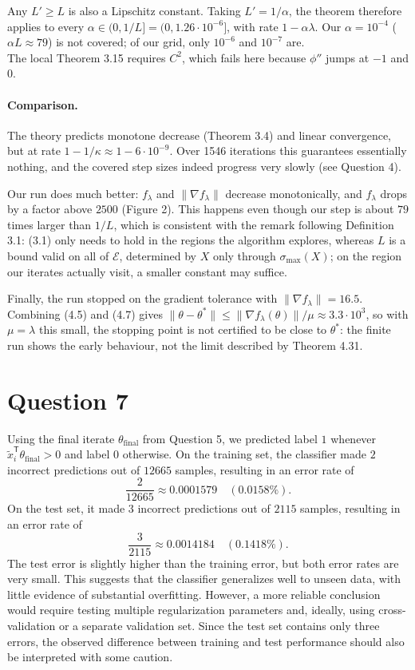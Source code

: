 \documentclass{article}
\theoremstyle{definition}
\theoremstyle{remark}
\begin{document}
Any $L' \ge L$ is also a Lipschitz constant. Taking $L' = 1/\alpha$, the theorem therefore applies to every $\alpha \in (0, 1/L] = (0, 1.26\cdot 10^{-6}]$, with rate $1 - \alpha\lambda$. Our $\alpha = 10^{-4}$ ($\alpha L \approx 79$) is not covered; of our grid, only $10^{-6}$ and $10^{-7}$ are. \\ The local Theorem 3.15 requires $C^2$, which fails here because $\phi''$ jumps at $-1$ and $0$.

\paragraph{Comparison.} The theory predicts monotone decrease (Theorem 3.4) and linear convergence, but at rate $1 - 1/\kappa \approx 1 - 6\cdot 10^{-9}$. Over 1546 iterations this guarantees essentially nothing, and the covered step sizes indeed progress very slowly (see Question 4).

Our run does much better: $f_\lambda$ and $\|\nabla f_\lambda\|$ decrease monotonically, and $f_\lambda$ drops by a factor above $2500$ (Figure 2). This happens even though our step is about $79$ times larger than $1/L$, which is consistent with the remark following Definition 3.1: (3.1) only needs to hold in the regions the algorithm explores, whereas $L$ is a bound valid on all of $\mathcal E$, determined by $X$ only through $\sigma_{\max}(X)$; on the region our iterates actually visit, a smaller constant may suffice.

Finally, the run stopped on the gradient tolerance with $\|\nabla f_\lambda\| = 16.5$. Combining (4.5) and (4.7) gives $\|\theta - \theta^*\| \le \|\nabla f_\lambda(\theta)\|/\mu \approx 3.3\cdot 10^{3}$, so with $\mu = \lambda$ this small, the stopping point is not certified to be close to $\theta^*$: the finite run shows the early behaviour, not the limit described by Theorem 4.31.


\section*{Question 7}
Using the final iterate $\theta_{\mathrm{final}}$ from Question 5, we predicted label $1$ whenever $\widetilde{x}_i^{\mathsf{T}}\theta_{\mathrm{final}}>0$ and label $0$ otherwise. On the training set, the classifier made $2$ incorrect predictions out of $12665$ samples, resulting in an error rate of
\[
\frac{2}{12665} \approx 0.0001579 \quad (0.0158\%).
\]
On the test set, it made $3$ incorrect predictions out of $2115$ samples, resulting in an error rate of
\[
\frac{3}{2115} \approx 0.0014184 \quad (0.1418\%).
\]
The test error is slightly higher than the training error, but both error rates are very small. This suggests that the classifier generalizes well to unseen data, with little evidence of substantial overfitting. However, a more reliable conclusion would require testing multiple regularization parameters and, ideally, using cross-validation or a separate validation set. Since the test set contains only three errors, the observed difference between training and test performance should also be interpreted with some caution.
\end{document}
